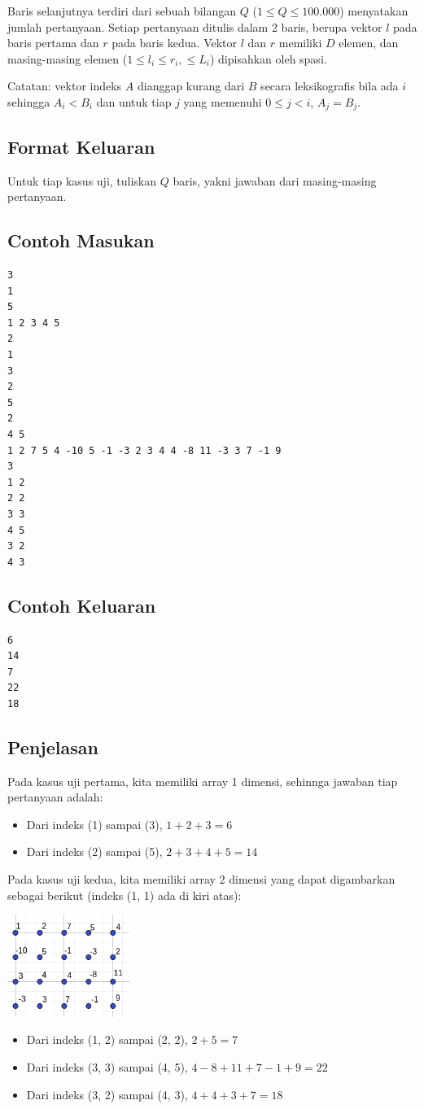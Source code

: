 \documentclass{article}
\begin{document}
Baris selanjutnya terdiri dari sebuah bilangan $Q$ ($1 \leq Q \leq 100.000$) menyatakan jumlah pertanyaan.
Setiap pertanyaan ditulis dalam 2 baris, berupa vektor $l$ pada baris pertama dan $r$ pada baris kedua. Vektor $l$ dan $r$ memiliki $D$ elemen, dan masing-masing elemen ($1 \leq l_i \leq r_i, \leq L_i$) dipisahkan oleh spasi.

Catatan: vektor indeks $A$ dianggap kurang dari $B$ secara leksikografis bila ada $i$ sehingga $A_i < B_i$ dan untuk tiap $j$ yang memenuhi $0 \leq j < i$, $A_j = B_j$.

\subsection*{Format Keluaran}

Untuk tiap kasus uji, tuliskan $Q$ baris, yakni jawaban dari masing-masing pertanyaan.

\pagebreak

\begin{multicols}{2}
\subsection*{Contoh Masukan}
\begin{lstlisting}
3
1
5
1 2 3 4 5
2
1
3
2
5
2
4 5
1 2 7 5 4 -10 5 -1 -3 2 3 4 4 -8 11 -3 3 7 -1 9
3
1 2
2 2
3 3
4 5
3 2
4 3
\end{lstlisting}
\columnbreak
\subsection*{Contoh Keluaran}
\begin{lstlisting}
6
14
7
22
18
\end{lstlisting}
\vfill
\null
\end{multicols}

\subsection*{Penjelasan}
Pada kasus uji pertama, kita memiliki array 1 dimensi, sehinnga jawaban tiap pertanyaan adalah:
\begin{itemize}
    \item Dari indeks (1) sampai (3), $1 + 2 + 3 = 6$
    \item Dari indeks (2) sampai (5), $2 + 3 + 4 + 5 = 14$
\end{itemize}

Pada kasus uji kedua, kita memiliki array 2 dimensi yang dapat digambarkan sebagai berikut (indeks (1, 1) ada di kiri atas):

\includegraphics[width=150px]{sample-2}

\begin{itemize}
    \item Dari indeks (1, 2) sampai (2, 2), $2 + 5 = 7$
    \item Dari indeks (3, 3) sampai (4, 5), $4 - 8 + 11 + 7 - 1 + 9 = 22$
    \item Dari indeks (3, 2) sampai (4, 3), $4 + 4 + 3 + 7 = 18$
\end{itemize}

\pagebreak
\end{document}
